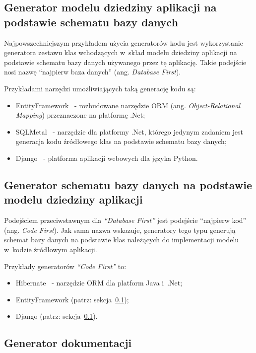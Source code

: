 \subsection{Generator modelu dziedziny aplikacji na podstawie schematu bazy danych} \label{sec:database_first}

Najpowszechniejszym przykładem użycia generatorów kodu jest wykorzystanie generatora zestawu klas wchodzących w~skład modelu dziedziny aplikacji na podstawie schematu bazy danych używanego przez tę aplikację.
Takie podejście nosi nazwę ``najpierw baza danych'' (ang. \emph{Database First}).

Przykładami narzędzi umożliwiających taką generację kodu są:

\begin{itemize}
 \item EntityFramework~\cite{entity_framework} - rozbudowane narzędzie ORM (ang. \emph{Object-Relational Mapping}) przeznaczone na platformę .Net;
 \item SQLMetal~\cite{sqlmetal} - narzędzie dla platformy .Net, którego jedynym zadaniem jest generacja kodu źródłowego klas na podstawie schematu bazy danych;
 \item Django~\cite{django} - platforma aplikacji webowych dla języka Python.
\end{itemize}


\subsection{Generator schematu bazy danych na podstawie modelu dziedziny aplikacji}

Podejściem przeciwstawnym dla \emph{``Database First''} jest podejście ``najpierw kod'' (ang. \emph{Code First}).
Jak sama nazwa wskazuje, generatory tego typu generują schemat bazy danych na podstawie klas należących do implementacji modelu w~kodzie źródłowym aplikacji.

Przykłady generatorów \emph{``Code First''} to:

\begin{itemize}
 \item Hibernate~\cite{hibernate} - narzędzie ORM dla platform Java i~.Net;
 \item EntityFramework (patrz: sekcja~\ref{sec:database_first});
 \item Django (patrz: sekcja~\ref{sec:database_first}).
\end{itemize}


\subsection{Generator dokumentacji}

